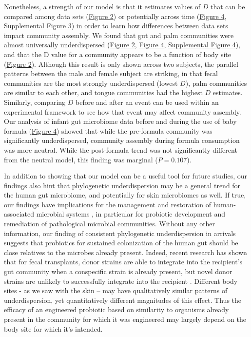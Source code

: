 \documentclass{article}
\begin{document}
Nonetheless, a strength of our model is that it estimates values of \(D\) that can be compared among data sets (\hyperref[sec:figure2]{Figure 2}) or potentially across time (\hyperref[sec:figure4]{Figure 4}, \hyperref[sec:figureS3]{Supplemental Figure 3}) in order to learn how differences between data sets impact community assembly. We found that gut and palm communities were almost universally underdispersed (\hyperref[sec:figure2]{Figure 2}, \hyperref[sec:figure4]{Figure 4}, \hyperref[sec:figureS4]{Supplemental Figure 4}), and that the D value for a community appears to be a function of body site (\hyperref[sec:figure2]{Figure 2}). Although this result is only shown across two subjects, the parallel patterns between the male and female subject are striking, in that fecal communities are the most strongly underdispersed (lowest \(D\)), palm communities are similar to each other, and tongue communities had the highest \(D\) estimates.  Similarly, comparing \(D\) before and after an event can be used within an experimental framework to see how that event may affect community assembly. Our analysis of infant gut microbiome data \cite{Koenig2011} before and during the use of baby formula (\hyperref[sec:figure4]{Figure 4}) showed that while the pre-formula community was significantly underdispersed, community assembly during formula consumption was more neutral. While the post-formula trend was not significantly different from the neutral model, this finding was marginal (\(P = 0.107\)). 
\par
In addition to showing that our model can be a useful tool for future studies, our findings also hint that phylogenetic underdispersion may be a general trend for the human gut microbiome, and potentially for skin microbiomes as well. If true, our findings have implications for the management and restoration of human-associated microbial systems \cite{Shooner2015}, in particular for probiotic development and remediation of pathological microbial communities. Without any other information, our finding of consistent phylogenetic underdispersion in arrivals suggests that probiotics for sustained colonization of the human gut should be close relatives to the microbes already present. Indeed, recent research has shown that for fecal transplants, donor strains are able to integrate into the recipient's gut community when a conspecific strain is already present, but novel donor strains are unlikely to successfully integrate into the recipient \cite{Li2016}. Different body sites - as we saw with the skin – may have qualitatively similar patterns of underdispersion, yet quantitatively different magnitudes of this effect. Thus the efficacy of an engineered probiotic based on similarity to organisms already present in the community for which it was engineered may largely depend on the body site for which it's intended.
\end{document}
